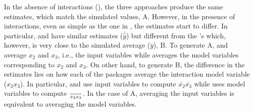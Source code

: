 %
In the absence of interactions (), the three approaches produce the same estimates, which match the simulated values, A. However, in the presence of interactions, even as simple as the one in , the estimates start to differ. In particular,  and  have similar estimates ($\bar{\hat{y}}$) but different from the 's which, however, is very close to the simulated average ($\bar{y}$), B. To generate A,   and  average $x_2$ and $x_3$, i.e., the input variables while  averages the model variables corresponding to $x_2$ and $x_3$. On other hand, to generate B, the difference in the estimates lies on how each of the packages average the interaction model variable ($x_2x_3$). In particular,  and  use input variables to compute $\bar{x_2}\bar{x_3}$ while  uses model variables to compute $\over{x_2x_3}$. In the case of A, averaging the input variables is equivalent to averaging the model variables.


